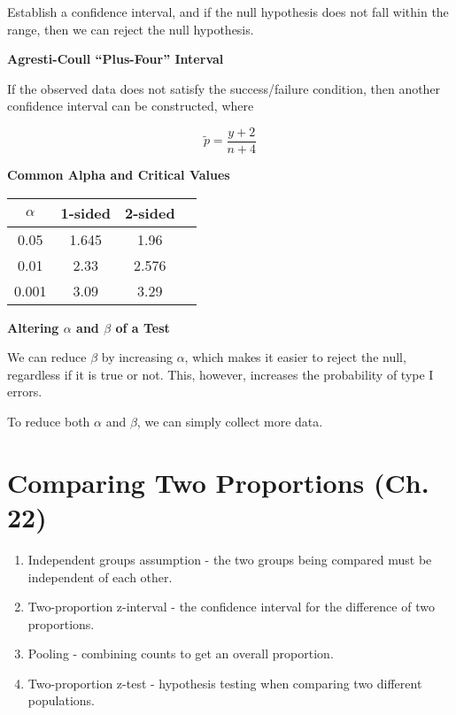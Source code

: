 \documentclass{article}
\theoremstyle{definition}
\begin{document}
Establish a confidence interval, and if the null hypothesis does not fall within the range, then we can reject the null hypothesis.

\vspace{2ex}
\textbf{Agresti-Coull “Plus-Four” Interval}

If the observed data does not satisfy the success/failure condition, then another confidence interval can be constructed, where

\begin{equation}
    \tilde{p} = \frac{y+2}{n+4}
\end{equation}

\textbf{Common Alpha and Critical Values}

\vspace{2ex}
\begin{center}
    \begin{tabular}{ |c|c|c|c| }
    \hline
    $\alpha$ & 1-sided & 2-sided \\
    \hline
    0.05 & 1.645 & 1.96 \\
    0.01 & 2.33 & 2.576 \\
    0.001 & 3.09 & 3.29 \\
    \hline
    \end{tabular}
\end{center}

\vspace{2ex}
\textbf{Altering $\alpha$ and $\beta$ of a Test}

We can reduce $\beta$ by increasing $\alpha$, which makes it easier to reject the null, regardless if it is true or not. This, however, increases the probability of type I errors.

To reduce both $\alpha$ and $\beta$, we can simply collect more data.

\pagebreak

\section{Comparing Two Proportions (Ch. 22)}

\begin{enumerate}[label=\textbf{\roman*.}]
    \item Independent groups assumption - the two groups being compared must be independent of each other.

    \item Two-proportion z-interval - the confidence interval for the difference of two proportions.

    \item Pooling - combining counts to get an overall proportion.

    \item Two-proportion z-test - hypothesis testing when comparing two different populations.

\end{enumerate}
\end{document}
